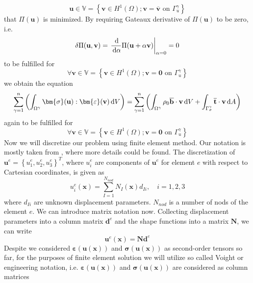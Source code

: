 \documentclass{article}
\newcommand{\beq}{\begin{equation}}
\newcommand{\eeq}{\end{equation}}
\newcommand{\dd}{\,{\rm d}}
\begin{document}
\beq\label{25}
\mathbf{u}\in \mathbb{V}=\left\{\mathbf{v} \in H^{1}(\Omega); \mathbf{v}=\overline{\mathbf{v}} \text{ on } \Gamma_{u}^{\gamma}\right\}
\eeq
that $ \Pi(\mathbf{u}) $ is minimized. By requiring Gateaux derivative of $ \Pi(\mathbf{u}) $ to be zero, i.e.
\beq\label{26}
\delta \Pi(\mathbf{u},\mathbf{v})=\left.\frac{\dd}{\dd \alpha} \Pi(\mathbf{u}+\alpha \mathbf{v})\right|_{\alpha=0} = 0
\eeq
to be fulfilled for   
\beq\label{27}
\forall\mathbf{v}\in {\mathbb{V}=\left\{\mathbf{v} \in H^{1}(\Omega); \mathbf{v}=\mathbf{0} \text { on } \Gamma_{u}^{\gamma}\right\}} 
\eeq
we obtain the equation
\begin{equation}\label{28}
\sum^{n}_{\gamma = 1}\left(\int_{\Omega^{\gamma}} \bm{\sigma}(\mathbf{u}) : \bm{\varepsilon}(\mathbf{v}) \dd V\right)=\sum^{n}_{\gamma = 1}\left(\int_{\Omega^{\gamma}} \rho_{0}\overline{\mathbf{b}} \cdot \mathbf{v} \dd V+\int_{\Gamma_{\sigma}^{\gamma}} \overline{\mathbf{t}} \cdot \mathbf{\mathbf{v}} \dd A\right)
\end{equation}
again to be fulfilled for    
\beq
\forall\mathbf{v}\in {\mathbb{V}=\left\{\mathbf{v} \in H^{1}(\Omega); \mathbf{v}=\mathbf{0} \text { on } \Gamma_{u}^{\gamma}\right\}}
\nonumber 
\eeq
Now we will discretize our problem using finite element method. Our notation is mostly taken from \cite[p.886]{Jirasek}, where more details could be found. The discretization of $ \mathbf{u}^{e}=\left\{u^{e}_{1}, u^{e}_{2}, u^{e}_{3}\right\}^{T} $, where $ u^{e}_{i} $ are components of $ \mathbf{u}^{e} $ for element $ e $ with respect to Cartesian coordinates, is given as 
\begin{equation}\label{29}
u^{e}_{i}(\mathbf{x}) = \sum_{I=1}^{N_{n o d}} N_{I}(\mathbf{x}) d_{I i}, \quad i=1,2,3
\end{equation}
where $d_{I i}$ are unknown displacement parameters. $ N_{n o d} $ is a number of nods of the element $e$. We can introduce matrix notation now. Collecting displacement parameters into a column matrix $\mathbf{d}^{e}$ and the shape functions into a matrix $\mathbf{N}$, we can write
\beq\label{30}
\mathbf{u}^{e}(\mathbf{x}) = \mathbf{N}\mathbf{d}^{e}
\eeq
Despite we considered $ \bm{\varepsilon}(\mathbf{u}(\mathbf{x})) $ and $ \bm{\sigma}(\mathbf{u(\mathbf{x})}) $ as second-order tensors so far, for the purposes of finite element solution we will utilize so called Voight or engineering notation, i.e. $ \bm{\varepsilon}(\mathbf{u}(\mathbf{x})) $ and $ \bm{\sigma}(\mathbf{u}(\mathbf{x})) $ are considered as column matrices
\end{document}
